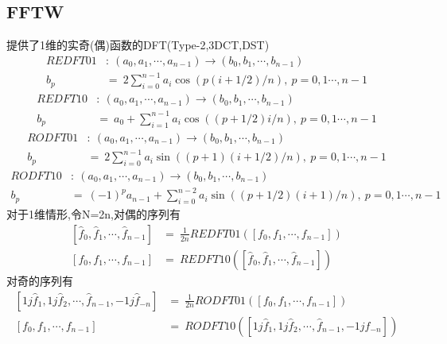 \documentclass[UTF8]{ctexart}
\begin{document}
\subsection{FFTW}
提供了1维的实奇(偶)函数的DFT(Type-2,3DCT,DST)
\begin{equation}
 \begin{split}
 REDFT01 & : \   (a_0,a_1,\cdots,a_{n-1}) \rightarrow (b_0,b_1,\cdots,b_{n-1})     \\
  b_p &=\  2\sum\limits_{i=0}^{n-1}a_i \cos(p(i+1/2)/n)  ,\ p=0,1\cdots,n-1
 \end{split}
\end{equation}
\begin{equation}
 \begin{split}
 REDFT10 & : \   (a_0,a_1,\cdots,a_{n-1}) \rightarrow (b_0,b_1,\cdots,b_{n-1})     \\
  b_p &=\ a_0 + \sum\limits_{i=1}^{n-1}a_i \cos((p+1/2)i/n)  ,\ p=0,1\cdots,n-1
 \end{split}
\end{equation}
\begin{equation}
 \begin{split}
 RODFT01 & : \   (a_0,a_1,\cdots,a_{n-1}) \rightarrow (b_0,b_1,\cdots,b_{n-1})     \\
  b_p &=\  2\sum\limits_{i=0}^{n-1}a_i \sin((p+1)(i+1/2)/n)  ,\ p=0,1\cdots,n-1
 \end{split}
\end{equation}
\begin{equation}
 \begin{split}
 RODFT10 & : \   (a_0,a_1,\cdots,a_{n-1}) \rightarrow (b_0,b_1,\cdots,b_{n-1})     \\
  b_p &=\ (-1)^{p}a_{n-1} + \sum\limits_{i=0}^{n-2}a_i \sin((p+1/2)(i+1)/n)  ,\ p=0,1\cdots,n-1
 \end{split}
\end{equation}
对于1维情形,令N=2n,对偶的序列有
\begin{equation}
 \begin{split}
 [\hat{f}_0,\hat{f}_1,\cdots,\hat{f}_{n-1}] & = \  \frac{1}{2n}  REDFT01( [f_0,f_1,\cdots,f_{n-1}] )  \\
  [f_0,f_1,\cdots,f_{n-1}] &=\  REDFT10( [\hat{f}_0,\hat{f}_1,\cdots,\hat{f}_{n-1}] )
 \end{split}
\end{equation}
对奇的序列有
\begin{equation}
 \begin{split}
 [1j\hat{f}_1,1j\hat{f}_2,\cdots,\hat{f}_{n-1},-1j\hat{f}_{-n}] & = \  \frac{1}{2n}  RODFT01( [f_0,f_1,\cdots,f_{n-1}] )  \\
  [f_0,f_1,\cdots,f_{n-1}] &=\  RODFT10( [1j\hat{f}_1,1j\hat{f}_2,\cdots,\hat{f}_{n-1},-1j\hat{f}_{-n}] )
 \end{split}
\end{equation}
\end{document}
